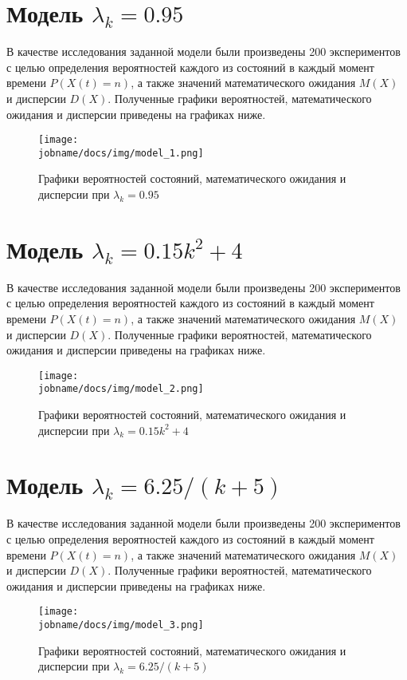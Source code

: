 \section*{Модель $\lambda_k = 0.95$}

В качестве исследования заданной модели были произведены 200 экспериментов с целью определения вероятностей каждого
из состояний в каждый момент времени $P(X(t)=n)$, а также значений математического ожидания $M(X)$ и дисперсии $D(X)$.
Полученные графики вероятностей, математического ожидания и дисперсии приведены на графиках ниже.

\begin{figure}[h!]
    \centering
    \texttt{[image: \\jobname/docs/img/model\_1.png]}
    \caption{Графики вероятностей состояний, математического ожидания и дисперсии при $\lambda_k = 0.95$}
\end{figure}

\section*{Модель $\lambda_k = 0.15k^2 + 4$}

В качестве исследования заданной модели были произведены 200 экспериментов с целью определения вероятностей каждого
из состояний в каждый момент времени $P(X(t)=n)$, а также значений математического ожидания $M(X)$ и дисперсии $D(X)$.
Полученные графики вероятностей, математического ожидания и дисперсии приведены на графиках ниже.

\begin{figure}[h!]
    \centering
    \texttt{[image: \\jobname/docs/img/model\_2.png]}
    \caption{Графики вероятностей состояний, математического ожидания и дисперсии при $\lambda_k = 0.15k^2 + 4$}
\end{figure}

\section*{Модель $\lambda_k = 6.25 / (k+5)$}

В качестве исследования заданной модели были произведены 200 экспериментов с целью определения вероятностей каждого
из состояний в каждый момент времени $P(X(t)=n)$, а также значений математического ожидания $M(X)$ и дисперсии $D(X)$.
Полученные графики вероятностей, математического ожидания и дисперсии приведены на графиках ниже.

\begin{figure}[h!]
    \centering
    \texttt{[image: \\jobname/docs/img/model\_3.png]}
    \caption{Графики вероятностей состояний, математического ожидания и дисперсии при $\lambda_k = 6.25 / (k+5)$}
\end{figure}

